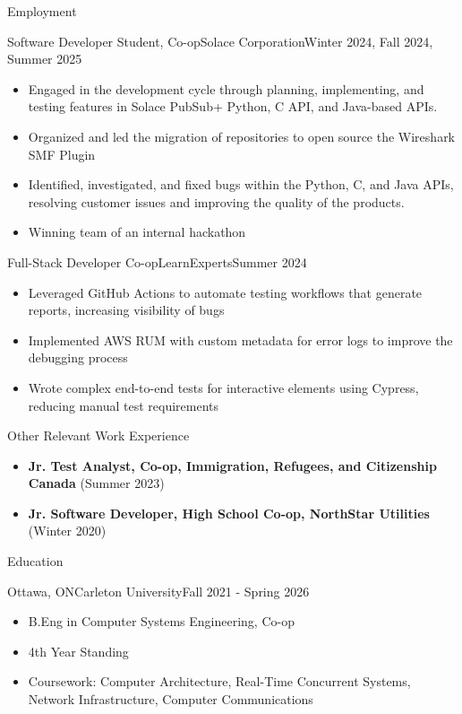 \documentclass[]{mcdowellcv}
\begin{document}
	\begin{cvsection}{Employment}
		
	\begin{cvsubsection}{Software Developer Student, Co-op}{Solace Corporation}{Winter 2024, Fall 2024, Summer 2025}			
		\begin{itemize}
			\item Engaged in the development cycle through planning, implementing, and testing features in Solace PubSub+ Python, C API, and Java-based APIs.
			\item Organized and led the migration of repositories to open source the Wireshark SMF Plugin
			\item Identified, investigated, and fixed bugs within the Python, C, and Java APIs, resolving customer issues and improving the quality of the products.
			\item Winning team of an internal hackathon
			
		\end{itemize}
	\end{cvsubsection}

	\begin{cvsubsection}{Full-Stack Developer Co-op}{LearnExperts}{Summer 2024}			
		\begin{itemize}
			\item Leveraged GitHub Actions to automate testing workflows that generate reports, increasing visibility of bugs
			\item Implemented AWS RUM with custom metadata for error logs to improve the debugging process
			\item Wrote complex end-to-end tests for interactive elements using Cypress, reducing manual test requirements
		\end{itemize}
	\end{cvsubsection}

	\begin{cvsubsection}{Other Relevant Work Experience}{}{}
		\begin{itemize}
			\item \textbf{Jr. Test Analyst, Co-op, Immigration, Refugees, and Citizenship Canada} (Summer 2023)
			\item \textbf{Jr. Software Developer, High School Co-op, NorthStar Utilities} (Winter 2020)
		\end{itemize}
	\end{cvsubsection}
	\end{cvsection}

	\begin{cvsection}{Education}
		\begin{cvsubsection}{Ottawa, ON}{Carleton University}{Fall 2021 - Spring 2026}
			\begin{itemize}
				\item B.Eng in Computer Systems Engineering, Co-op
				\item 4th Year Standing
				\item Coursework: Computer Architecture, Real-Time Concurrent Systems, Network Infrastructure, Computer Communications
			\end{itemize}
		\end{cvsubsection}
	\end{cvsection}
	
\end{document}
